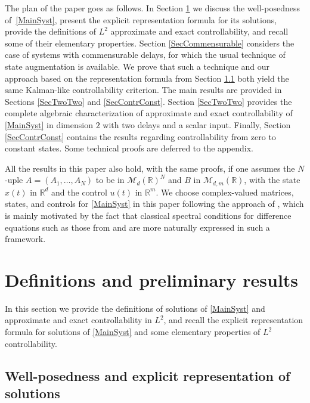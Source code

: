 \documentclass[10pt]{amsart}
\theoremstyle{plain}
\theoremstyle{definition}
\let\Subsection\subsection\let\Subsubsection\subsubsection
\begin{document}
The plan of the paper goes as follows. In Section \ref{SecPrevResults} we discuss the well-posedness of~\eqref{MainSyst}, present the explicit representation formula for its solutions, provide the definitions of $L^2$ approximate and exact controllability, and recall some of their elementary properties. Section \ref{SecCommensurable} considers the case of systems with commensurable delays, for which the usual technique of state augmentation is available. We prove that such a technique and our approach based on the representation formula from Section \ref{SecControlDelayWellPosed} both yield the same Kalman-like controllability criterion. The main results are provided in Sections \ref{SecTwoTwo} and \ref{SecContrConst}. Section \ref{SecTwoTwo} provides the complete algebraic characterization of approximate and exact controllability of \eqref{MainSyst} in dimension $2$ with two delays and a scalar input. Finally, Section \ref{SecContrConst} contains the results regarding controllability from zero to constant states. Some technical proofs are deferred to the appendix.

All the results in this paper also hold, with the same proofs, if one assumes the $N$\nobreakdash-uple $A = (A_1, \dots, A_N)$ to be in $\mathcal M_d(\mathbb R)^N$
and $B$ in $\mathcal M_{d, m}(\mathbb R)$, with the state $x(t)$ in $\mathbb R^d$ and the control $u(t)$ in $\mathbb R^m$. We choose complex-valued matrices, states, and controls for \eqref{MainSyst} in this paper following the approach of \cite{Chitour2016Stability}, which is mainly motivated by the fact that classical spectral conditions for difference equations such as those from \cite{Avellar1980Zeros, Henry1974Linear, Hale2002Strong} and \cite[Chap.\,9]{Hale1993Introduction} are more naturally expressed in such a framework.

\section{Definitions and preliminary results}
\label{SecPrevResults}

In this section we provide the definitions of solutions of \eqref{MainSyst} and approximate and exact controllability in $L^2$, and recall the explicit representation formula for solutions of \eqref{MainSyst} and some elementary properties of $L^2$ controllability.

\Subsection{Well-posedness and explicit representation of solutions}
\label{SecControlDelayWellPosed}
\end{document}
